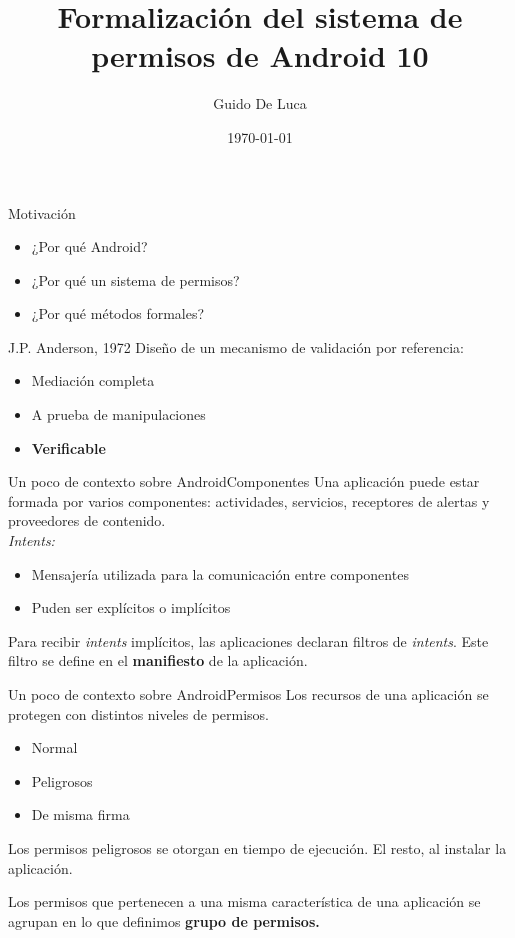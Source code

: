 \documentclass[pdf]{beamer} %
\title{Formalización del sistema de permisos de Android 10}
\author[Universidad Nacional de Rosario]{Guido De Luca}
\institute{Universidad Nacional de Rosario}
\date{\today}
\begin{document}


\begin{frame}[plain]
    \titlepage
\end{frame}

\begin{frame}{Motivación}
    \begin{itemize}[<+->]
        \item ¿Por qué Android?
        \item ¿Por qué un sistema de permisos?
        \item ¿Por qué métodos formales?
    \end{itemize}
\end{frame}

\begin{frame}{J.P. Anderson, 1972}
    Diseño de un mecanismo de validación por referencia:
    \pause
    \begin{itemize}[<+->]
        \item Mediación completa
        \item A prueba de manipulaciones
        \item \textbf{Verificable}
    \end{itemize}
\end{frame}

\begin{frame}{Un poco de contexto sobre Android}{Componentes}
    Una aplicación puede estar formada por varios componentes: actividades, servicios, receptores de
    alertas y proveedores de contenido.\\
    \pause
    \vspace{20px}
    \textit{Intents:} \\
    \begin{itemize}
        \item Mensajería utilizada para la comunicación entre componentes
        \item Puden ser explícitos o implícitos
    \end{itemize}
    \vspace{10px}
    Para recibir \textit{intents} implícitos, las aplicaciones declaran filtros de \textit{intents}.
    Este filtro se define en el \textbf{manifiesto} de la aplicación.
\end{frame}

\begin{frame}{Un poco de contexto sobre Android}{Permisos}
    Los recursos de una aplicación se protegen con distintos niveles de permisos.
    \begin{itemize}
        \item Normal
        \item Peligrosos
        \item De misma firma
    \end{itemize}
    \vspace{20px} \pause Los permisos peligrosos se  otorgan en tiempo de ejecución. El resto, al
    instalar la aplicación.

    \vspace{20px} \pause Los permisos que pertenecen a una misma característica de una aplicación
    se agrupan en lo que definimos \textbf{grupo de permisos.}
\end{frame}
\end{document}
